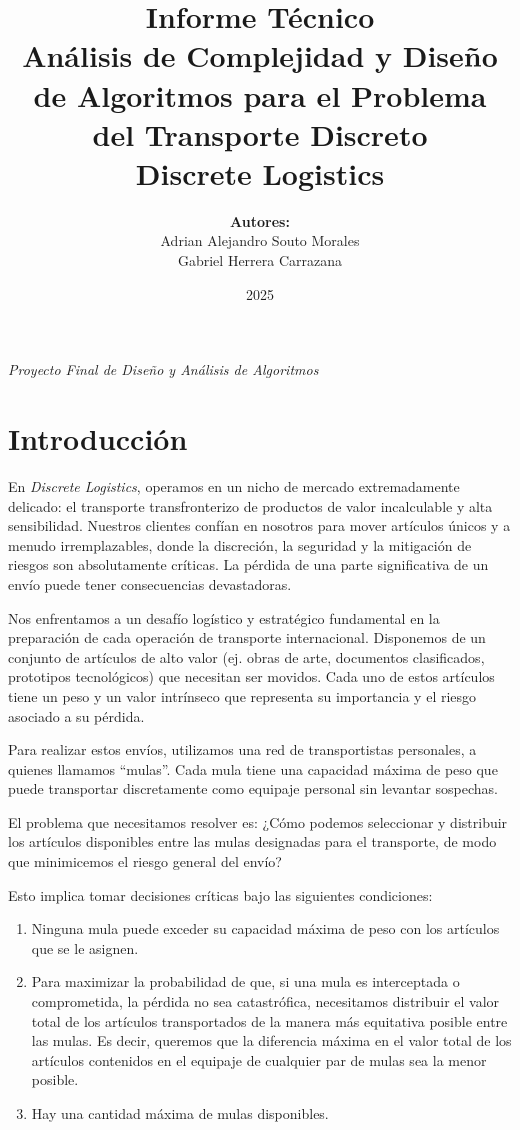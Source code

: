 \documentclass[12pt, a4paper]{article}
\title{
    \vspace{1cm}
    \Huge \textbf{Informe Técnico} \\
    \vspace{0.5cm}
    \Large Análisis de Complejidad y Diseño de Algoritmos para el Problema del Transporte Discreto \\
    \vspace{1.5cm}
    \large \textbf{Discrete Logistics} \\
    \vspace{2cm}
}
\author{
    \textbf{Autores:} \\
    Adrian Alejandro Souto Morales \\
    Gabriel Herrera Carrazana \\
}
\date{2025}
\begin{document}
    \begin{titlepage}
        \maketitle
        \thispagestyle{empty}
        \vfill
        \centering
        \textit{Proyecto Final de Diseño y Análisis de Algoritmos}
    \end{titlepage}

    \section{Introducción}
    En \textit{Discrete Logistics}, operamos en un nicho de mercado extremadamente delicado: el transporte transfronterizo de productos de valor incalculable y alta sensibilidad. Nuestros clientes confían en nosotros para mover artículos únicos y a menudo irremplazables, donde la discreción, la seguridad y la mitigación de riesgos son absolutamente críticas. La pérdida de una parte significativa de un envío puede tener consecuencias devastadoras.

    Nos enfrentamos a un desafío logístico y estratégico fundamental en la preparación de cada operación de transporte internacional. Disponemos de un conjunto de artículos de alto valor (ej. obras de arte, documentos clasificados, prototipos tecnológicos) que necesitan ser movidos. Cada uno de estos artículos tiene un peso y un valor intrínseco que representa su importancia y el riesgo asociado a su pérdida.

    Para realizar estos envíos, utilizamos una red de transportistas personales, a quienes llamamos ``mulas''. Cada mula tiene una capacidad máxima de peso que puede transportar discretamente como equipaje personal sin levantar sospechas.

    El problema que necesitamos resolver es: ¿Cómo podemos seleccionar y distribuir los artículos disponibles entre las mulas designadas para el transporte, de modo que minimicemos el riesgo general del envío?

    Esto implica tomar decisiones críticas bajo las siguientes condiciones:
    \begin{enumerate}
        \item Ninguna mula puede exceder su capacidad máxima de peso con los artículos que se le asignen.
        \item Para maximizar la probabilidad de que, si una mula es interceptada o comprometida, la pérdida no sea catastrófica, necesitamos distribuir el valor total de los artículos transportados de la manera más equitativa posible entre las mulas. Es decir, queremos que la diferencia máxima en el valor total de los artículos contenidos en el equipaje de cualquier par de mulas sea la menor posible.
        \item Hay una cantidad máxima de mulas disponibles.
    \end{enumerate}
\end{document}
